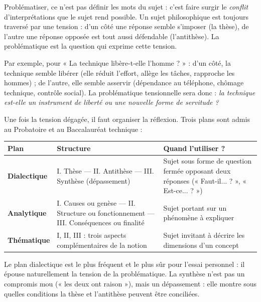 \documentclass[11pt]{article}
\newcommand{\cle}[1]{{\popxbold\color{popdark}#1}}
\newcounter{popsec}
\newcounter{popsub}
\newcommand{\courssub}[1]{%
  \stepcounter{popsub}%
  \par\vspace{9pt}\noindent{\popxbold\fontsize{11.5}{13}\selectfont\color{popink}{\color{poporange}\thepopsec.\thepopsub}\hspace{6pt}#1}\par\nopagebreak\vspace{4pt}
}
\begin{document}
\begin{definition}[Problématiser]
\cle{Problématiser}, ce n'est pas définir les mots du sujet : c'est faire surgir le \emph{conflit} d'interprétations que le sujet rend possible. Un sujet philosophique est toujours traversé par une tension : d'un côté une réponse semble s'imposer (la thèse), de l'autre une réponse opposée est tout aussi défendable (l'antithèse). La problématique est la question qui exprime cette tension.
\end{definition}

Par exemple, pour « La technique libère-t-elle l'homme ? » : d'un côté, la technique semble libérer (elle réduit l'effort, allège les tâches, rapproche les hommes) ; de l'autre, elle semble asservir (dépendance au téléphone, chômage technique, contrôle social). La problématique tensionnelle sera donc : \emph{la technique est-elle un instrument de liberté ou une nouvelle forme de servitude ?}

\courssub{Le choix du plan}

Une fois la tension dégagée, il faut organiser la réflexion. Trois plans sont admis au Probatoire et au Baccalauréat technique :

\begin{center}
\begin{tabularx}{\linewidth}{|l|X|X|}
\hline
\rowcolor{popblueL} \textbf{Plan} & \textbf{Structure} & \textbf{Quand l'utiliser ?} \\
\hline
\textbf{Dialectique} & I. Thèse — II. Antithèse — III. Synthèse (dépassement) & Sujet sous forme de question fermée opposant deux réponses (« Faut-il... ? », « Est-ce... ? ») \\
\hline
\textbf{Analytique} & I. Causes ou genèse — II. Structure ou fonctionnement — III. Conséquences ou finalité & Sujet portant sur un phénomène à expliquer \\
\hline
\textbf{Thématique} & I, II, III : trois aspects complémentaires de la notion & Sujet invitant à décrire les dimensions d'un concept \\
\hline
\end{tabularx}
\end{center}

Le \cle{plan dialectique} est le plus fréquent et le plus sûr pour l'essai personnel : il épouse naturellement la tension de la problématique. La synthèse n'est pas un compromis mou (« les deux ont raison »), mais un dépassement : elle montre sous quelles conditions la thèse et l'antithèse peuvent être conciliées.
\end{document}
